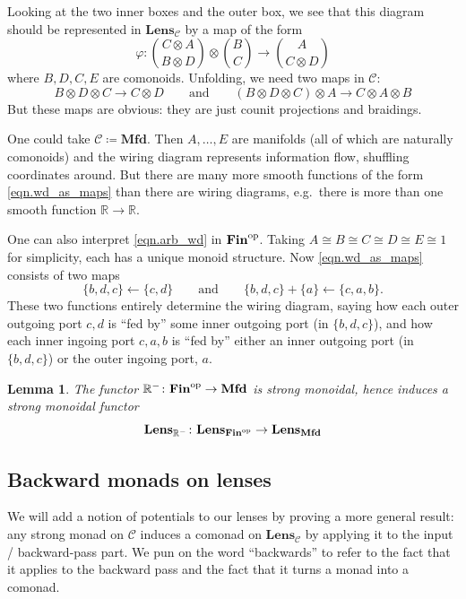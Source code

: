 \documentclass[11pt, oneside, article]{memoir}
\theoremstyle{definition}
\theoremstyle{plain}
\newtheorem{lemma}[lemma]{Lemma}
\newcommand{\cat}[1]{\mathcal{#1}}%
\newcommand{\Cat}[1]{\mathbf{#1}}%
\newcommand{\from}{\leftarrow}
\newcommand{\op}{^\tn{op}}
\newcommand{\tn}[1]{\textnormal{#1}}
\newcommand{\rr}{\mathbb{R}}
\newcommand{\finset}{\Cat{Fin}}
\newcommand{\qqand}{\qquad\text{and}\qquad}
\newcommand{\mfd}{\Cat{Mfd}}
\newcommand{\Lens}[1]{\Cat{Lens}_{#1}}
\begin{document}
Looking at the two inner boxes and the outer box, we see that this diagram should be represented in $\Lens{\cat{C}}$ by a map of the form
\[
\varphi\colon\binom{C\otimes A}{B\otimes D}\otimes\binom{B}{C}\to\binom{A}{C\otimes D}
\]
where $B,D,C,E$ are comonoids. Unfolding, we need two maps in $\cat{C}$:
\begin{equation}\label{eqn.wd_as_maps}
B\otimes D\otimes C\to C\otimes D
\qqand
(B\otimes D\otimes C)\otimes A\to C\otimes A\otimes B
\end{equation}
But these maps are obvious: they are just counit projections and braidings.

One could take $\cat{C}\coloneqq\mfd$. Then $A,\ldots, E$ are manifolds (all of which are naturally comonoids) and the wiring diagram represents information flow, shuffling coordinates around. But there are many more smooth functions of the form \eqref{eqn.wd_as_maps} than there are wiring diagrams, e.g.\ there is more than one smooth function $\rr\to\rr$.

One can also interpret \eqref{eqn.arb_wd} in $\finset\op$. Taking $A\cong B\cong C\cong D\cong E\cong 1$ for simplicity, each has a unique monoid structure. Now \eqref{eqn.wd_as_maps} consists of two maps
\[
\{b,d,c\}\from\{c,d\}
\qqand
\{b,d,c\}+\{a\}\from\{c,a,b\}.
\]
These two functions entirely determine the wiring diagram, saying how each outer outgoing port $c,d$ is ``fed by'' some inner outgoing port (in $\{b,d,c\}$), and how each inner ingoing port $c,a,b$ is ``fed by'' either an inner outgoing port (in $\{b,d,c\}$) or the outer ingoing port, $a$. 

\begin{lemma}\label{lemma.lens_rr}
The functor $\rr^-\colon\finset\op\to\mfd$ is strong monoidal, hence induces a strong monoidal functor
\[
\Lens{\rr^-}\colon\Lens{\finset\op}\to\Lens{\mfd}
\]
\end{lemma}

\subsection{Backward monads on lenses}\label{subsec.backwards}

We will add a notion of potentials to our lenses by proving a more general result: any strong monad on $\cat{C}$ induces a comonad on $\Lens{\cat{C}}$ by applying it to the input / backward-pass part. We pun on the word ``backwards'' to refer to the fact that it applies to the backward pass and the fact that it turns a monad into a comonad.
\end{document}
